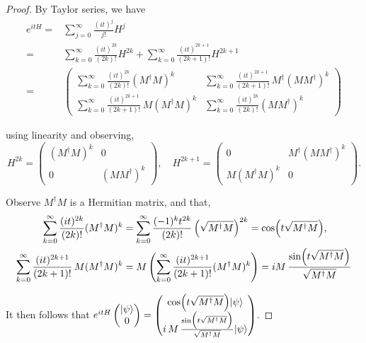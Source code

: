 \documentclass{article}
\begin{document}
\begin{proof}
    By Taylor series, we have
\begin{align*}
    e^{itH} = & \sum_{j=0}^{\infty}\frac{(it)^j}{j!}H^j \nonumber \\ = & \sum_{k=0}^{\infty} \frac{(it)^{2k}}{(2k)!}H^{2k} + \sum_{k=0}^{\infty} \frac{(it)^{2k+1}}{(2k+1)!}H^{2k+1} \nonumber \\
    = & \begin{pmatrix}
\sum\limits_{k=0}^{\infty} \frac{(it)^{2k}}{(2k)!}(M^\dagger M)^k & \sum\limits_{k=0}^{\infty} \frac{(it)^{2k+1}}{(2k+1)!}\, M^\dagger (MM^\dagger)^k \\[1mm]
\sum\limits_{k=0}^{\infty} \frac{(it)^{2k+1}}{(2k+1)!}\, M (M^\dagger M)^k & \sum\limits_{k=0}^{\infty} \frac{(it)^{2k}}{(2k)!}(MM^\dagger)^k
\end{pmatrix}
\end{align*}

using linearity and observing,
\[
H^{2k} = \begin{pmatrix} (M^\dagger M)^k & 0 \\ 0 & (MM^\dagger)^k \end{pmatrix}, \quad 
H^{2k+1} = \begin{pmatrix} 0 & M^\dagger (MM^\dagger)^k \\ M (M^\dagger M)^k & 0 \end{pmatrix}.
\]

Observe \(M^\dagger M\) is a Hermitian matrix, and that, 
\begin{align*}
\sum_{k=0}^{\infty} \frac{(it)^{2k}}{(2k)!}(M^\dagger M)^k & 
 = \sum_{k=0}^{\infty} \frac{(-1)^k t^{2k}}{(2k)!} \left(\sqrt{M^\dagger M}\right)^{2k} = \cos\Bigl(t\sqrt{M^\dagger M}\Bigr),   \\
\sum_{k=0}^{\infty}\frac{(it)^{2k+1}}{(2k+1)!}\,M (M^\dagger M)^k 
& = M \left( \sum_{k=0}^{\infty}\frac{(it)^{2k+1}}{(2k+1)!}(M^\dagger M)^k \right)
= i M\,\frac{\sin\Bigl(t\sqrt{M^\dagger M}\Bigr)}{\sqrt{M^\dagger M}}
\end{align*}

It then follows that \(e^{itH} \begin{pmatrix} |\psi\rangle \\ 0 \end{pmatrix} = \begin{pmatrix}
\cos\Bigl(t\sqrt{M^\dagger M}\Bigr)|\psi\rangle \\[1mm]
i\,M\,\frac{\sin\Bigl(t\sqrt{M^\dagger M}\Bigr)}{\sqrt{M^\dagger M}}|\psi\rangle
\end{pmatrix}\).


\end{proof}
\end{document}
